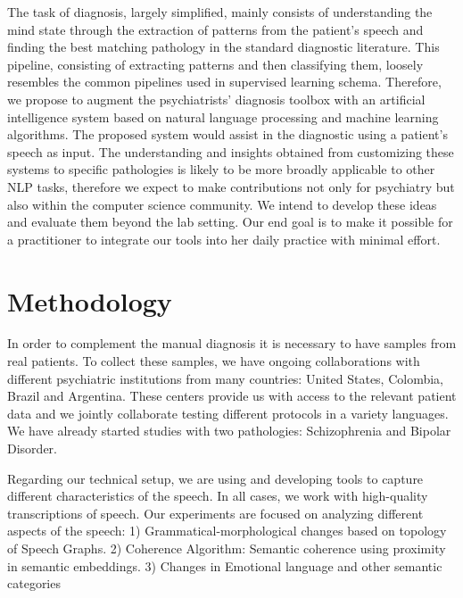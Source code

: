 \documentclass[11pt,a4paper]{article}
\begin{document}
The task of diagnosis, largely simplified, mainly consists of understanding the mind state through the  extraction of patterns from the patient's speech and finding the best matching pathology in the standard diagnostic literature. This pipeline, consisting of extracting patterns and then classifying them, loosely resembles the common pipelines used in supervised learning schema. Therefore, we propose to augment the psychiatrists’ diagnosis toolbox with an artificial intelligence system based on natural language processing and machine learning algorithms. The proposed system would assist in the diagnostic using a patient’s speech as input. The understanding and insights obtained from customizing these systems to specific pathologies is likely to be more broadly applicable to other NLP tasks, therefore we expect to make contributions not only for psychiatry but also within the computer science community. We intend to develop these ideas and evaluate them beyond the lab setting. Our end goal is to make it possible for a practitioner to integrate our tools into her daily practice with minimal effort.


\section{Methodology}
In order to complement the manual diagnosis it is necessary to have samples from real patients. To collect these samples, we have ongoing collaborations with different psychiatric institutions from many countries: United States, Colombia, Brazil and Argentina. These centers provide us with access to the relevant patient data and we jointly collaborate testing different protocols in a variety languages. We have already started studies with two pathologies: Schizophrenia and Bipolar Disorder.

Regarding our technical setup, we are using and developing tools to capture different characteristics of the speech. In all cases, we work with high-quality transcriptions of speech. Our experiments are focused on analyzing different aspects of the speech: 1) Grammatical-morphological changes based on topology of Speech Graphs. 2) Coherence Algorithm: Semantic coherence using proximity in semantic embeddings. 3) Changes in Emotional language and other semantic categories
\end{document}
